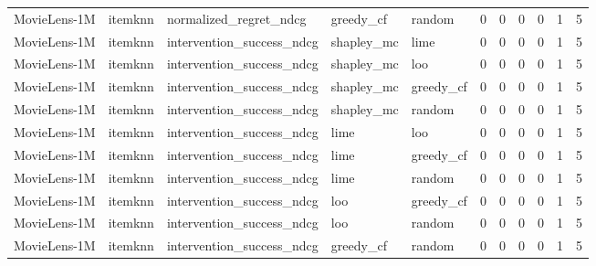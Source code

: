 \begin{table}[t]
{\begin{tabular}{lllllrrrrrr}
MovieLens-1M & itemknn & normalized\_regret\_ndcg & greedy\_cf & random & 0 & 0 & 0 & 0 & 1 & 5 \\
MovieLens-1M & itemknn & intervention\_success\_ndcg & shapley\_mc & lime & 0 & 0 & 0 & 0 & 1 & 5 \\
MovieLens-1M & itemknn & intervention\_success\_ndcg & shapley\_mc & loo & 0 & 0 & 0 & 0 & 1 & 5 \\
MovieLens-1M & itemknn & intervention\_success\_ndcg & shapley\_mc & greedy\_cf & 0 & 0 & 0 & 0 & 1 & 5 \\
MovieLens-1M & itemknn & intervention\_success\_ndcg & shapley\_mc & random & 0 & 0 & 0 & 0 & 1 & 5 \\
MovieLens-1M & itemknn & intervention\_success\_ndcg & lime & loo & 0 & 0 & 0 & 0 & 1 & 5 \\
MovieLens-1M & itemknn & intervention\_success\_ndcg & lime & greedy\_cf & 0 & 0 & 0 & 0 & 1 & 5 \\
MovieLens-1M & itemknn & intervention\_success\_ndcg & lime & random & 0 & 0 & 0 & 0 & 1 & 5 \\
MovieLens-1M & itemknn & intervention\_success\_ndcg & loo & greedy\_cf & 0 & 0 & 0 & 0 & 1 & 5 \\
MovieLens-1M & itemknn & intervention\_success\_ndcg & loo & random & 0 & 0 & 0 & 0 & 1 & 5 \\
MovieLens-1M & itemknn & intervention\_success\_ndcg & greedy\_cf & random & 0 & 0 & 0 & 0 & 1 & 5 \\
\bottomrule
\end{tabular}
}
\end{table}
